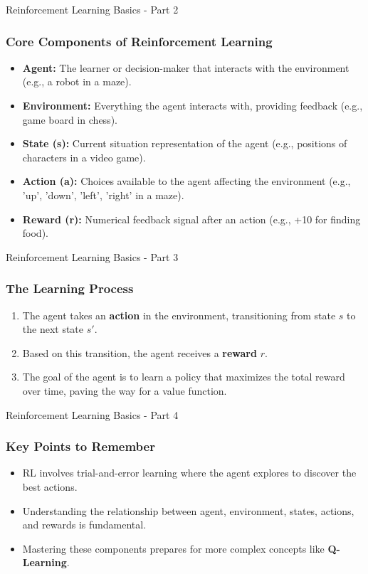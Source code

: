 \documentclass[aspectratio=169]{beamer}
\begin{document}
\begin{frame}[fragile]{Reinforcement Learning Basics - Part 2}
    \frametitle{Core Components of Reinforcement Learning}
    \begin{itemize}
        \item \textbf{Agent:} The learner or decision-maker that interacts with the environment (e.g., a robot in a maze).
        
        \item \textbf{Environment:} Everything the agent interacts with, providing feedback (e.g., game board in chess).
        
        \item \textbf{State (s):} Current situation representation of the agent (e.g., positions of characters in a video game).
        
        \item \textbf{Action (a):} Choices available to the agent affecting the environment (e.g., 'up', 'down', 'left', 'right' in a maze).
        
        \item \textbf{Reward (r):} Numerical feedback signal after an action (e.g., +10 for finding food).
    \end{itemize}
\end{frame}

\begin{frame}[fragile]{Reinforcement Learning Basics - Part 3}
    \frametitle{The Learning Process}
    \begin{enumerate}
        \item The agent takes an \textbf{action} in the environment, transitioning from state \( s \) to the next state \( s' \).
        \item Based on this transition, the agent receives a \textbf{reward} \( r \).
        \item The goal of the agent is to learn a policy that maximizes the total reward over time, paving the way for a value function.
    \end{enumerate}
\end{frame}

\begin{frame}[fragile]{Reinforcement Learning Basics - Part 4}
    \frametitle{Key Points to Remember}
    \begin{itemize}
        \item RL involves trial-and-error learning where the agent explores to discover the best actions.
        \item Understanding the relationship between agent, environment, states, actions, and rewards is fundamental.
        \item Mastering these components prepares for more complex concepts like \textbf{Q-Learning}.
    \end{itemize}
\end{frame}
\end{document}
